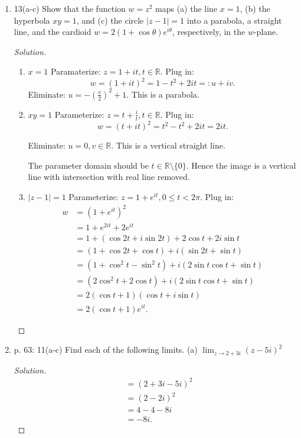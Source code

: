 \begin{enumerate}
\begin{proof}[Solution]
\end{proof}

	\item 13(a-c) Show that the function $w=z^2$ maps
(a) the line $x=1$,
(b) the hyperbola $x y=1$, and
(c) the circle $|z-1|=1$
into a parabola, a straight line, and the cardioid $w=2(1+\cos \theta) e^{i \theta}$, respectively, in the $w$-plane.
\begin{proof}[Solution]
	\begin{enumerate}
		\item $x=1$ 
		Paramaterize: $z = 1 + it, t \in \mathbb{R}$. Plug in: \[
		w = (1+it)^2 = 1 - t^2 + 2 i t =: u + i v
		.\] 
Eliminate: $u = - (\frac{v}{2})^2 + 1$. This is a parabola.
		\item $xy=1$ 
		Parameterize: $z = t + \frac{i}{t}, t \in \mathbb{R}$. Plug in: \[
		w = (t + it)^2 =  t^2 - t^2 + 2 it = 2 it
		.\] 
		
Eliminate: $u = 0, v \in \mathbb{R}$. This is a vertical straight line.
	\begin{correction}
			The parameter domain should be $t \in \mathbb{R}\setminus \{0\} $. Hence the image is a vertical line with intersection with real line removed.
		\end{correction}
		\item $|z-1|=1$
		Parameterize: $z = 1 + e^{it}, 0\le t<2 \pi$. Plug in: \begin{align*}
		w &= (1 + e^{it})^2 \\
		  &= 1 + e^{2 i t} + 2 e ^{it} \\
		  &= 1 + (\cos 2t + i\sin 2t) + 2 \cos t + 2 i \sin t \\
		  &= (1 + \cos 2t + \cos t) + i (\sin 2 t + \sin t) \\
		  &= (1 + \cos^2 t - \sin^2 t) + i (2 \sin t \cos t + \sin t)\\
		  &= (2 \cos^2 t + 2 \cos t) + i (2 \sin t \cos t + \sin t) \\
		  &= 2(\cos t + 1) (\cos t + i \sin t) \\
		  &= 2(\cos t + 1) e^{it}
		.\end{align*} 
	\end{enumerate}
\end{proof}

	\item p. 63: 11(a-c) Find each of the following limits.
(a) $\lim _{z \rightarrow 2+3 i}(z-5 i)^2$
\begin{proof}[Solution]
	\begin{align*}
		&= (2+3i - 5i)^2 \\
		&= (2-2i)^{2} \\
		&= 4 - 4 - 8i \\
		&= -8i
	.\end{align*}
\end{proof}


\end{enumerate}
